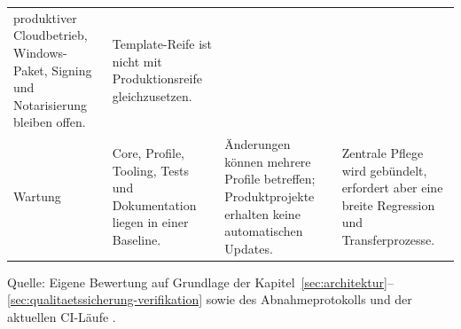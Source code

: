 \begin{table}[htbp]
\begin{tabularx}{\textwidth}{@{}>{\raggedright\arraybackslash}p{}>{\raggedright\arraybackslash}p{}>{\raggedright\arraybackslash}p{}>{\raggedright\arraybackslash}X@{}}
      produktiver Cloudbetrieb, Windows-Paket, Signing und Notarisierung
      bleiben offen. & Template-Reife ist nicht mit Produktionsreife
      gleichzusetzen. \\
    Wartung & Core, Profile, Tooling, Tests und Dokumentation liegen in einer
      Baseline. & Änderungen können mehrere Profile betreffen; Produktprojekte
      erhalten keine automatischen Updates. & Zentrale Pflege wird gebündelt,
      erfordert aber eine breite Regression und Transferprozesse. \\
    \bottomrule
  \end{tabularx}
  \smallskip
  {\footnotesize Quelle: Eigene Bewertung auf Grundlage der
  Kapitel~\ref{sec:architektur}--\ref{sec:qualitaetssicherung-verifikation}
  sowie des Abnahmeprotokolls und der aktuellen CI-Läufe
  \parencite{kleiveist2026acceptance,kleiveist2026ci-core-run,kleiveist2026ci-profiles-run,kleiveist2026ci-postgres-run,kleiveist2026ci-desktop-run,kleiveist2026quality-implementation,kleiveist2026governance-core-run,kleiveist2026governance-profiles-run}.
  \par}
\end{table}
